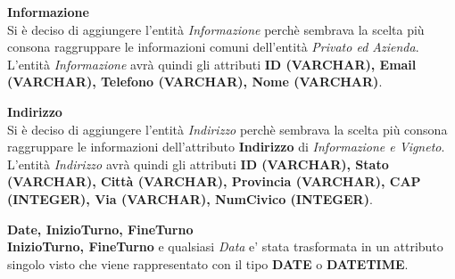 \textbf{\large{Informazione}}\\
Si è deciso di aggiungere l'entità \emph{Informazione} perchè sembrava la scelta più consona raggruppare le informazioni comuni dell'entità \emph{Privato ed Azienda}. L'entità \emph{Informazione} avrà quindi gli attributi \textbf{ID (VARCHAR), Email (VARCHAR), Telefono (VARCHAR), Nome (VARCHAR)}.

\begin{flushleft}
\textbf{\large{Indirizzo}}\\
Si è deciso di aggiungere l'entità \emph{Indirizzo} perchè sembrava la scelta più consona raggruppare le informazioni dell'attributo \textbf{Indirizzo} di \emph{Informazione e Vigneto}. L'entità \emph{Indirizzo} avrà quindi gli attributi \textbf{ID (VARCHAR), Stato (VARCHAR), Città (VARCHAR), Provincia (VARCHAR), CAP (INTEGER), Via (VARCHAR), NumCivico (INTEGER)}.
\end{flushleft}

\begin{flushleft}
\textbf{\large{Date, InizioTurno, FineTurno}}\\
\textbf{InizioTurno, FineTurno} e qualsiasi \emph{Data} e' stata trasformata in un attributo singolo visto che viene rappresentato con il tipo \textbf{DATE} o \textbf{DATETIME}.
\end{flushleft}
